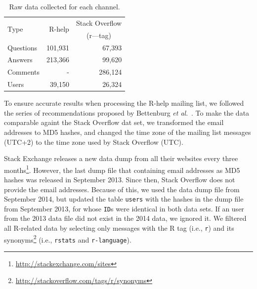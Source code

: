 \documentclass{sig-alternate-05-2015}
\begin{document}
	\begin{table}[!htb]
		\caption{Raw data collected for each channel.}
		\begin{center}
			\begin{tabular}{lrr}
				\toprule
				\multirow{2}{*}{Type} & \multirow{2}{*}{R-help} & Stack Overflow \\
				                      &                         & \multicolumn{1}{c}{(r---tag)}\\
				\midrule
				Questions     & 101,931 &  67,393 \\
				Answers       & 213,366 &  99,620 \\
				Comments      &       - & 286,124 \\
				Users         &  39,150 &  26,324 \\
				\bottomrule
			\end{tabular} 
		\end{center}
		\label{table:data}
	\end{table}



To ensure accurate results when processing the R-help mailing list, we followed the series of recommendations proposed by Bettenburg \textit{et al}.~\cite{Bettenburg2009}.
To make the data comparable againt the Stack Overflow dat set, we transformed the email addresses to MD5 hashes, and changed the time zone of the mailing list messages (UTC+2) to the time zone used by Stack Overflow (UTC).

Stack Exchange releases a new data dump from all their websites every three months\footnote{\url{http://stackexchange.com/sites}}.
However, the last dump file that containing email addresses as MD5 hashes was released in September 2013.
Since then, Stack Overflow does not provide the email addresses.
Because of this, we used the data dump file from September 2014, but updated the table \texttt{users} with the hashes in the dump file from September 2013, for whose \texttt{ID}s were identical in both data sets.
If an user from the 2013 data file did not exist in the 2014 data, we ignored it.
We filtered all R-related data by selecting only messages with the R tag (i.e., \texttt{r}) and its synonyms\footnote{\url{http://stackoverflow.com/tags/r/synonyms}} (i.e., \texttt{rstats} and \texttt{r-language}).
\end{document}
